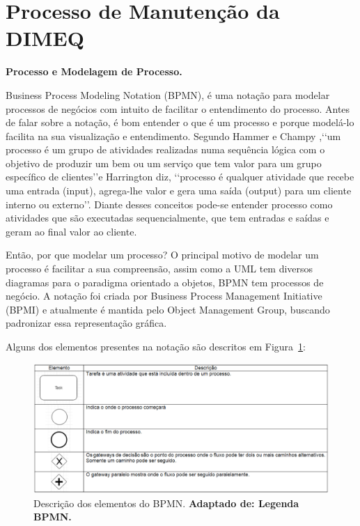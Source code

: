 
\section{Processo de Manutenção da DIMEQ}

\textbf{Processo e Modelagem de Processo.}

Business Process Modeling Notation (BPMN), é uma notação para modelar processos de negócios com intuito de facilitar o entendimento do processo. Antes de falar sobre a notação, é bom entender o que é um processo e porque modelá-lo facilita na sua visualização e entendimento. Segundo Hammer e Champy \cite{hammer1994reengenharia},\lq\lq um processo é um grupo de atividades realizadas numa sequência lógica com o objetivo de produzir um bem ou um serviço que tem valor para um grupo específico de clientes\rq\rq e Harrington \cite{harrington1993aperfeiccoando} diz, \lq\lq processo é qualquer atividade que recebe uma entrada (input), agrega-lhe valor e gera uma saída (output) para um cliente interno ou externo\rq\rq. Diante desses conceitos pode-se entender processo como atividades que são executadas sequencialmente, que tem entradas e saídas e geram ao final valor ao cliente.

Então, por que modelar um processo? O principal motivo de modelar um processo é facilitar a sua compreensão, assim como a UML tem diversos diagramas para o paradigma orientado a objetos, BPMN tem processos de negócio. A notação foi criada por Business Process Management Initiative (BPMI) e atualmente é mantida pelo Object Management Group, buscando padronizar essa representação gráfica.

Alguns dos elementos presentes na notação são descritos em Figura~\ref{table-processo}:


\graphicspath{{figuras/}}
\begin{figure}[H]
\centering
\includegraphics[width=1.0 \textwidth]{tabela-processo}
\caption{Descrição dos elementos do BPMN. \textbf{Adaptado de: Legenda BPMN.}}
\label{table-processo}
\end{figure}

